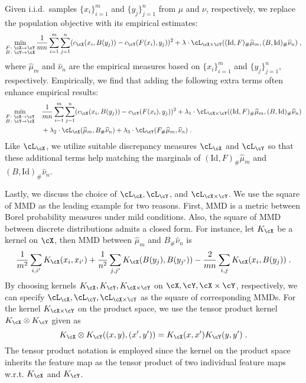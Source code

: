 \documentclass[11pt]{article}
\begin{document}
Given i.i.d.\ samples $\{x_i\}_{i=1}^{m}$ and $\{y_j\}_{j=1}^{n}$ from $\mu$ and $\nu$, respectively, we replace the population objective with its empirical estimates:
\begin{equation*}
	\min_{\substack{F \colon \cX \to \cY \\ B \colon \cY \to \cX}} \frac{1}{m n} \sum_{i = 1}^{m} \sum_{j = 1}^{n} (c_{\cX}(x_i, B(y_j)) - c_{\cY}(F(x_i), y_j))^2 + \lambda \cdot \cL_{\cX \times \cY}((\mathrm{Id}, F)_{\#} \widehat{\mu}_m, (B, \mathrm{Id})_{\#} \widehat{\nu}_n)\;,
\end{equation*}
where $\widehat{\mu}_m$ and $\widehat{\nu}_n$ are the empirical measures based on $\{x_i\}_{i=1}^{m}$ and $\{y_j\}_{j=1}^{n}$, respectively. Empirically, we find that adding the following extra terms often enhance empirical results:
\begin{equation*}
	\begin{split}
		\min_{\substack{F \colon \cX \to \cY \\ B \colon \cY \to \cX}} \quad & \frac{1}{m n} \sum_{i = 1}^{m} \sum_{j = 1}^{n} (c_{\cX}(x_i, B(y_j)) - c_{\cY}(F(x_i), y_j))^2 + \lambda_1 \cdot \cL_{\cX \times \cY}((\mathrm{Id}, F)_{\#} \widehat{\mu}_m, (B, \mathrm{Id})_{\#} \widehat{\nu}_n) \\
		& + \lambda_2 \cdot \cL_{\cX}(\widehat{\mu}_m, B_{\#} \widehat{\nu}_n) + \lambda_3 \cdot \cL_{\cY}(F_{\#} \widehat{\mu}_m, \widehat{\nu}_n)\;.
	\end{split}
\end{equation*}
Like $\cL_{\cX}$, we utilize suitable discrepancy measures $\cL_{\cX}$ and $\cL_{\cY}$ so that these additional terms help matching the marginals of $(\mathrm{Id}, F)_{\#} \widehat{\mu}_m$ and $(B, \mathrm{Id})_{\#} \widehat{\nu}_n$.

Lastly, we discuss the choice of $\cL_{\cX}, \cL_{\cY}$, and $\cL_{\cX \times \cY}$. We use the square of MMD as the leading example for two reasons. First, MMD is a metric between Borel probability measures under mild conditions. Also, the square of MMD between discrete distributions admits a closed form. For instance, let $K_{\cX}$ be a kernel on $\cX$, then MMD between $\widehat{\mu}_m$ and $B_{\#} \widehat{\nu}_n$ is
\begin{equation*}
	\frac{1}{m^2} \sum_{i, i'} K_{\cX}(x_i, x_{i'})	+ \frac{1}{n^2} \sum_{j, j'} K_{\cX}(B(y_j), B(y_{j'}))	- \frac{2}{mn} \sum_{i, j} K_{\cX}(x_i, B(y_j))\;.
\end{equation*}
By choosing kernels $K_{\cX}, K_{\cY}, K_{\cX \times \cY}$ on $\cX, \cY, \cX \times \cY$, respectively, we can specify $\cL_{\cX}, \cL_{\cY}, \cL_{\cX \times \cY}$ as the square of corresponding MMDs. For the kernel $K_{\cX \times \cY}$ on the product space, we use the tensor product kernel $K_{\cX} \otimes K_{\cY}$ given as
\begin{equation*}
	K_{\cX} \otimes K_{\cY}((x, y), (x', y')) = K_{\cX}(x, x') K_{\cY}(y, y')\;.
\end{equation*}
The tensor product notation is employed since the kernel on the product space inherits the feature map as the tensor product of two individual feature maps w.r.t. $K_{\cX}$ and $K_{\cY}$.
\end{document}
